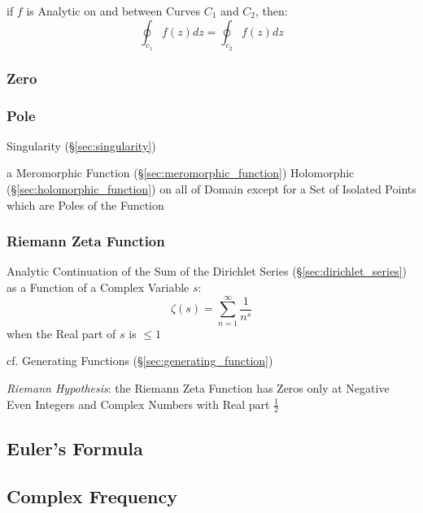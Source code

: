 if $f$ is Analytic on and between Curves $C_1$ and $C_2$, then:
\[
  \oint_{c_1} f(z) dz = \oint_{c_2} f(z) dz
\]



\subsubsection{Zero}\label{sec:complex_zero}

\subsubsection{Pole}\label{sec:complex_pole}

Singularity (\S\ref{sec:singularity})

a Meromorphic Function (\S\ref{sec:meromorphic_function}) Holomorphic
(\S\ref{sec:holomorphic_function}) on all of Domain except for a Set of
Isolated Points which are Poles of the Function



\subsubsection{Riemann Zeta Function}\label{sec:riemann_zeta}

Analytic Continuation of the Sum of the Dirichlet Series
(\S\ref{sec:dirichlet_series}) as a Function of a Complex Variable $s$:
\[
  \zeta(s) = \sum_{n=1}^\infty \frac{1}{n^s}
\]
when the Real part of $s$ is $\leq 1$

\fist cf. Generating Functions (\S\ref{sec:generating_function})

\emph{Riemann Hypothesis}: the Riemann Zeta Function has Zeros only at Negative
Even Integers and Complex Numbers with Real part $\frac{1}{2}$



\subsection{Euler's Formula}\label{sec:eulers_formula}

\subsection{Complex Frequency}\label{sec:complex_frequency}

